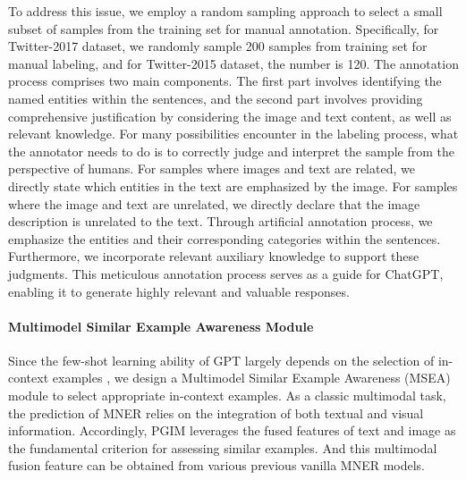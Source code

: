 \documentclass[11pt]{article}
\begin{document}
To address this issue, we employ a random sampling approach to select a small subset of samples from the training set for manual annotation. Specifically, for Twitter-2017 dataset, we randomly sample 200 samples from training set for manual labeling, and for Twitter-2015 dataset, the number is 120. The annotation process comprises two main components. The first part involves identifying the named entities within the sentences, and the second part involves providing comprehensive justification by considering the image and text content, as well as relevant knowledge. For many possibilities encounter in the labeling process, what the annotator needs to do is to correctly judge and interpret the sample from the perspective of humans. For samples where images and text are related, we directly state which entities in the text are emphasized by the image. For samples where the image and text are unrelated, we directly declare that the image description is unrelated to the text. Through artificial annotation process, we emphasize the entities and their corresponding categories within the sentences. Furthermore, we incorporate relevant auxiliary knowledge to support these judgments. This meticulous annotation process serves as a guide for ChatGPT, enabling it to generate highly relevant and valuable responses.

\paragraph{Multimodel Similar Example Awareness Module}
Since the few-shot learning ability of GPT largely depends on the selection of in-context examples \citep{liu2021makes,yang2022empirical}, we design a Multimodel Similar Example Awareness (MSEA) module to select appropriate in-context examples. As a classic multimodal task, the prediction of MNER relies on the integration of both textual and visual information. Accordingly, PGIM leverages the fused features of text and image as the fundamental criterion for assessing similar examples.
And this multimodal fusion feature can be obtained from various previous vanilla MNER models. 
\end{document}
